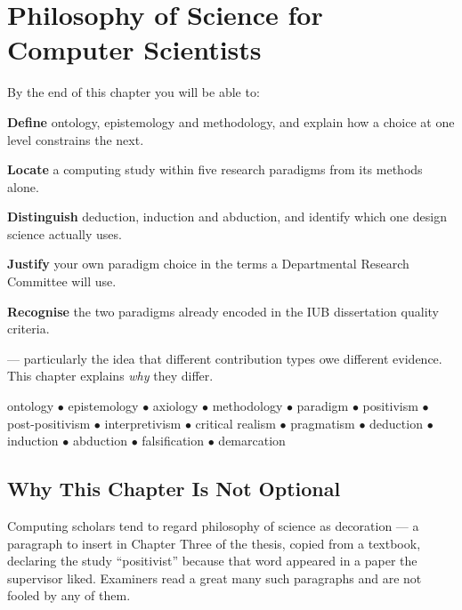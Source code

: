 \chapter{Philosophy of Science for Computer Scientists}\label{ch:philosophy}

\begin{outcomes}
By the end of this chapter you will be able to:
\begin{tight}
  \item \textbf{Define} ontology, epistemology and methodology, and explain how
    a choice at one level constrains the next.
  \item \textbf{Locate} a computing study within five research paradigms from
    its methods alone.
  \item \textbf{Distinguish} deduction, induction and abduction, and identify
    which one design science actually uses.
  \item \textbf{Justify} your own paradigm choice in the terms a Departmental
    Research Committee will use.
  \item \textbf{Recognise} the two paradigms already encoded in the IUB
    dissertation quality criteria.
\end{tight}
\end{outcomes}

\begin{prereq}
 --- particularly the idea that different contribution
types owe different evidence. This chapter explains \emph{why} they differ.
\end{prereq}

\begin{keyterms}
ontology $\bullet$ epistemology $\bullet$ axiology $\bullet$ methodology
$\bullet$ paradigm $\bullet$ positivism $\bullet$ post-positivism $\bullet$
interpretivism $\bullet$ critical realism $\bullet$ pragmatism $\bullet$
deduction $\bullet$ induction $\bullet$ abduction $\bullet$ falsification
$\bullet$ demarcation
\end{keyterms}

\section{Why This Chapter Is Not Optional}

Computing scholars tend to regard philosophy of science as decoration --- a
paragraph to insert in Chapter Three of the thesis, copied from a textbook,
declaring the study ``positivist'' because that word appeared in a paper the
supervisor liked. Examiners read a great many such paragraphs and are not
fooled by any of them.

